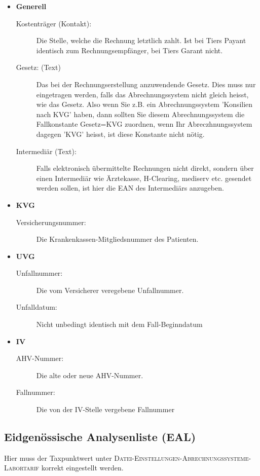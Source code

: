 \documentclass[a4paper]{scrartcl}
\begin{document}
\begin{itemize}
\item \textbf{Generell}\begin{description}
\item [Kostenträger (Kontakt):] Die Stelle, welche die Rechnung letztlich zahlt. Ist bei Tiers Payant identisch zum Rechnungsempfänger, bei Tiers Garant nicht.
\item [Gesetz: (Text)]  Das bei der Rechnungserstellung anzuwendende Gesetz. Dies muss nur eingetragen werden, falls das Abrechnungssystem nicht gleich heisst, wie das Gesetz. Also wenn Sie z.B. ein Abrechnungssystem 'Konsilien nach KVG' haben, dann sollten Sie diesem Abrechnungssystem die Fallkonstante Gesetz=KVG zuordnen, wenn Ihr Abreczhnungssystem dagegen 'KVG' heisst, ist diese Konstante nicht nötig.
\item [Intermediär (Text):] Falls elektronisch übermittelte Rechnungen nicht direkt, sondern über einen Intermediär wie Ärztekasse, H-Clearing, mediserv etc. gesendet werden sollen, ist hier die EAN des Intermediärs anzugeben.
\end{description}
\item\textbf{KVG}\begin{description}
\item [Versicherungsnummer: ] Die Krankenkassen-Mitgliedsnummer des Patienten.
\end{description}

\item\textbf{UVG}\begin{description}
\item [Unfallnummer: ] Die vom Versicherer veregebene Unfallnummer.
\item [Unfalldatum: ] Nicht unbedingt identisch mit dem Fall-Beginndatum
\end{description}

\item\textbf{IV}\begin{description}
\item [AHV-Nummer: ] Die alte oder neue AHV-Nummer.
\item [Fallnummer: ] Die von der IV-Stelle vergebene Fallnummer
\end{description}

\end{itemize}

\subsection{Eidgenössische Analysenliste (EAL)}
Hier muss der Taxpunktwert unter \textsc{Datei-Einstellungen-Abrechnungssysteme-Labortarif} korrekt eingestellt werden.
\end{document}
